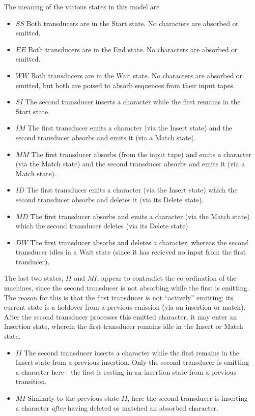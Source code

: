 \documentclass{article}
\begin{document}
The meaning of the various states in this model are
\begin{itemize}
\item $SS$ Both transducers are in the Start state.  No characters are absorbed or emitted.
\item $EE$ Both transducers are in the End state.  No characters are  absorbed or emitted.
\item $WW$ Both transducers are in the Wait state.  No characters are absorbed or emitted, but both are poised to absorb sequences from their input tapes.
\item $SI$ The second transducer inserts a character while the first remains in the Start state. 
\item $IM$ The first transducer  emits a character (via the Insert state) and the second transducer absorbs and emits it (via a Match state). 
\item $MM$ The first transducer  absorbs (from the input tape) and emits a character (via the Match state) and the second transducer absorbs and emits it (via a Match state). 
\item $ID$ The first transducer  emits a character (via the Insert state) which the second transducer absorbs and deletes it (via its Delete state). 
\item $MD$ The first transducer  absorbs and emits a character (via the Match state) which the second transducer deletes (via its Delete state). 
\item $DW$ The first transducer absorbs and deletes a character, whereas the second transducer idles in a Wait state (since it has recieved no input from the first tranducer).  
\end{itemize}

The last two states, $II$ and $MI$, appear to contradict the co-ordination of the machines, 
since the second transducer is not absorbing while the first is emitting. 
The reason for this is that the first transducer is not ``actively'' emitting; 
its current state is a holdover from a previous emission (via an insertion or match). 
After the second transducer processes this emitted character, it may enter an Insertion 
state, wherein the first transducer remains idle in the Insert or Match state. 
\begin{itemize}
\item $II$ The second transducer inserts a character while the first remains in the Insert state from a previous insertion.  Only the second transducer is emitting a character here---the first is resting in an insertion state from a previous transition.  
\item $MI$ Similarly to the previous state $II$, here the second transducer is inserting a character {\em after} having deleted or matched an absorbed character.
\end{itemize}
\end{document}
